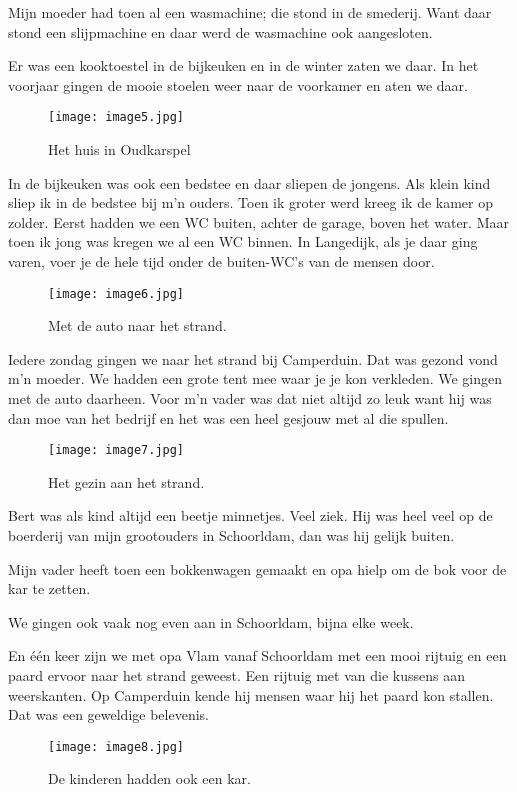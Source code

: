 Mijn moeder had toen al een wasmachine; die stond in de smederij. Want daar stond een slijpmachine
en daar werd de wasmachine ook aangesloten. 

Er was een kooktoestel in de bijkeuken en in de winter zaten we daar. In het voorjaar gingen de
mooie stoelen weer naar de voorkamer en aten we daar.  \begin{figure}[h]
\texttt{[image: image5.jpg]} \caption{Het huis in Oudkarspel} \end{figure} In de
bijkeuken was ook een bedstee en daar sliepen de jongens.  Als klein kind sliep ik in de bedstee bij
m’n ouders. Toen ik groter werd kreeg ik de kamer op zolder.  Eerst hadden we een WC buiten,
achter de garage, boven het water. Maar toen ik jong was kregen we al een WC binnen. In Langedijk,
als je daar ging varen, voer je de hele tijd onder de buiten-WC's van de mensen door.

\begin{figure}[h] \texttt{[image: image6.jpg]} \caption{Met de auto naar het
strand.} \end{figure}

Iedere zondag gingen we naar het strand bij Camperduin. Dat was gezond vond m’n moeder.  We
hadden een grote tent mee waar je je kon verkleden. We gingen met de auto daarheen. Voor m’n
vader was dat niet altijd zo leuk want hij was dan moe van het bedrijf en het was een heel gesjouw
met al die spullen.

\begin{figure}[hp] \texttt{[image: image7.jpg]} \caption{Het gezin aan het strand.}
\end{figure}

Bert was als kind altijd een beetje minnetjes. Veel ziek. Hij was heel veel op de boerderij van mijn
grootouders in Schoorldam, dan was hij gelijk buiten. 

Mijn vader heeft toen een bokkenwagen gemaakt en opa hielp om de bok voor de kar te zetten.

We gingen ook vaak nog even aan in Schoorldam, bijna elke week.

En \'{e}\'{e}n keer zijn we met opa Vlam vanaf Schoorldam met een mooi rijtuig en een paard ervoor
naar het strand geweest. Een rijtuig met van die kussens aan weerskanten. Op Camperduin kende hij
mensen waar hij het paard kon stallen. Dat was een geweldige belevenis.

\begin{figure}[h] \texttt{[image: image8.jpg]} \caption{De kinderen hadden ook
een kar.} \end{figure}

